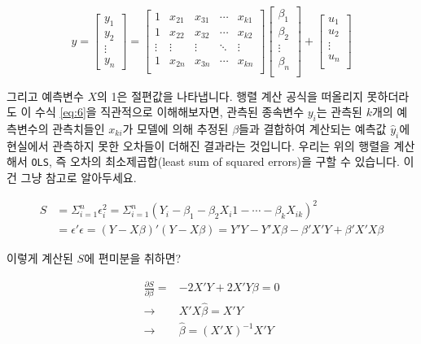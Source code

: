 \documentclass[
]{book}
\begin{document}
\begin{equation} \label{eq:6}
y = \begin{bmatrix}y_1 \\ y_2 \\ \vdots \\ y_n \end{bmatrix} = 
\begin{bmatrix}1 & x_{21} & x_{31} & \cdots & x_{k1}\\
1 & x_{22} & x_{32} & \cdots & x_{k2}\\
\vdots & \vdots & \vdots & \ddots & \vdots\\
1 & x_{2n} & x_{3n} & \cdots & x_{kn}\\\end{bmatrix}
\begin{bmatrix} \beta_1 \\ \beta_2 \\ \vdots \\ \beta_n \\\end{bmatrix} + 
\begin{bmatrix} u_1 \\ u_2 \\ \vdots \\ u_n \\\end{bmatrix}
\end{equation}

그리고 예측변수 \(X\)의 1은 절편값을 나타냅니다. 행렬 계산 공식을 떠올리지 못하더라도 이 수식 \ref{eq:6}을 직관적으로 이해해보자면, 관측된 종속변수 \(y_i\)는 관측된 \(k\)개의 예측변수의 관측치들인 \(x_{ki}\)가 모델에 의해 추정된 \(\beta\)들과 결합하여 계산되는 예측값 \(\hat{y}_i\)에 현실에서 관측하지 못한 오차들이 더해진 결과라는 것입니다. 우리는 위의 행렬을 계산해서 \texttt{OLS}, 즉 오차의 최소제곱합(least sum of squared errors)을 구할 수 있습니다. 이건 그냥 참고로 알아두세요.

\[
\begin{split}
S&=\Sigma^n_{i=1}\epsilon^{2}_{i} = \Sigma^n_{i=1}(Y_i - \beta_1 - \beta_2X_i1 - \cdots - \beta_kX_{ik})^2\\
 &=\epsilon'\epsilon = (Y - X\beta)'(Y-X\beta) = Y'Y - Y'X\beta - \beta'X'Y + \beta'X'X\beta
\end{split}
\]

이렇게 계산된 \(S\)에 편미분을 취하면?

\[
\begin{split}
\frac{\partial S}{\partial \beta} =&-2X'Y + 2X'Y\beta = 0\\
\rightarrow&X'X\hat{\beta}= X'Y\\
\rightarrow&\hat{\beta} = (X'X)^{-1}X'Y
\end{split}
\]
\end{document}
